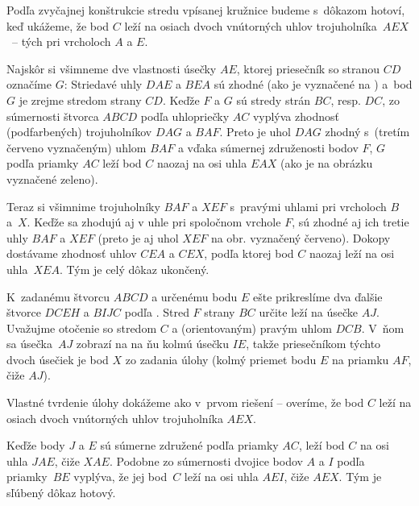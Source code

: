 {%
Podľa zvyčajnej konštrukcie stredu vpísanej kružnice budeme
s~dôkazom hotoví, keď ukážeme, že
bod $C$ leží na osiach dvoch vnútorných uhlov trojuholníka~$AEX$~-- tých
pri vrcholoch $A$ a $E$.

Najskôr si všimneme dve vlastnosti úsečky $AE$,
ktorej priesečník so stranou $CD$ označíme $G$: Striedavé uhly $DAE$ a $BEA$
sú zhodné (ako je vyznačené na \obr{}) a~bod $G$ je zrejme stredom
strany $CD$.
%
Keďže $F$ a $G$ sú stredy strán $BC$, resp. $DC$,
zo súmernosti štvorca $ABCD$ podľa uhlopriečky $AC$ vyplýva
zhodnosť (podfarbených) trojuholníkov $DAG$ a $BAF$. Preto je uhol $DAG$ zhodný s~(tretím červeno vyznačeným) uhlom $BAF$
a vďaka súmernej združenosti bodov $F$, $G$ podľa priamky $AC$
leží bod $C$ naozaj na osi uhla $EAX$ (ako je na obrázku
vyznačené zeleno).

Teraz si všimnime trojuholníky $BAF$ a $XEF$ s~pravými uhlami pri vrcholoch $B$
a~$X$. Keďže sa zhodujú aj v uhle
pri spoločnom vrchole $F$, sú zhodné aj ich tretie uhly
$BAF$ a $XEF$ (preto je aj uhol $XEF$ na obr. vyznačený
červeno).
Dokopy dostávame zhodnosť uhlov $CEA$ a $CEX$, podľa ktorej
bod $C$ naozaj leží na osi uhla~$XEA$.
Tým je celý dôkaz ukončený.

\ineriesenie
K~zadanému štvorcu $ABCD$ a určenému bodu $E$ ešte prikreslíme
dva ďalšie štvorce $DCEH$ a $BIJC$ podľa \obr{}.
Stred $F$ strany $BC$ určite leží na úsečke $AJ$.
%
Uvažujme otočenie so stredom $C$ a (orientovaným) pravým uhlom
$DCB$. V~ňom sa úsečka~$AJ$ zobrazí na na ňu kolmú úsečku $IE$,
takže priesečníkom týchto dvoch úsečiek je bod $X$ zo zadania úlohy
(kolmý priemet bodu $E$ na priamku $AF$, čiže $AJ$).

Vlastné tvrdenie úlohy dokážeme ako v~prvom riešení -- overíme,
že bod $C$ leží na osiach dvoch vnútorných uhlov trojuholníka $AEX$.

Keďže body $J$ a $E$ sú súmerne združené podľa priamky $AC$,
leží bod $C$ na osi uhla $JAE$, čiže $XAE$.
Podobne zo súmernosti dvojice bodov $A$ a $I$
podľa priamky~$BE$ vyplýva, že jej bod~$C$ leží na osi uhla
$AEI$, čiže $AEX$. Tým je sľúbený dôkaz hotový.

}
